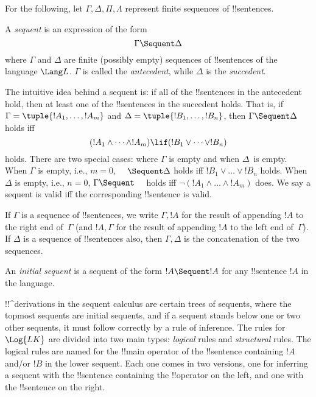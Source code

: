 \documentclass[../../../include/open-logic-section]{subfiles}
\begin{document}
      {}
      {}

For the following, let $\Gamma, \Delta, \Pi, \Lambda$ represent finite
sequences of !!{sentence}s.

\begin{defn}[Sequent]
A \emph{sequent} is an expression of the form
\[
\Gamma \Sequent \Delta
\]
where $\Gamma$ and $\Delta$ are finite (possibly empty) sequences of
!!{sentence}s of the language $\Lang L$. $\Gamma$ is called the
\emph{antecedent}, while $\Delta$ is the \emph{succedent}.
\end{defn}

\begin{explain}
The intuitive idea behind a sequent is: if all of the !!{sentence}s in
the antecedent hold, then at least one of the !!{sentence}s in the
succedent holds. That is, if $\Gamma = \tuple{!A_1, \dots, !A_m}$ and
$\Delta = \tuple{!B_1, \dots, !B_n}$, then $\Gamma \Sequent \Delta$
holds iff
\[
(!A_1 \land \cdots \land !A_m) \lif (!B_1 \lor \cdots \lor
!B_n)
\]
holds. There are two special cases: where $\Gamma$ is empty and when
$\Delta$~is empty. When $\Gamma$ is empty, i.e., $m = 0$, $\quad
\Sequent \Delta$ holds iff $!B_1 \lor \dots \lor !B_n$ holds. When
$\Delta$ is empty, i.e., $n = 0$, $\Gamma \Sequent \quad$ holds iff
$\lnot(!A_1 \land \dots \land !A_m)$ does.  We say a sequent is valid
iff the corresponding !!{sentence} is valid.
\end{explain}

If $\Gamma$ is a sequence of !!{sentence}s, we write $\Gamma, !A$ for
the result of appending $!A$ to the right end of~$\Gamma$ (and $!A,
\Gamma$ for the result of appending $!A$ to the left end
of~$\Gamma$). If $\Delta$ is a sequence of !!{sentence}s also, then $\Gamma,
\Delta$ is the concatenation of the two sequences.

\begin{defn}
An \emph{initial sequent} is a sequent
{of the form $!A \Sequent !A$} for any !!{sentence} $!A$ in the language.
\end{defn}

!!^{derivation}s in the sequent calculus are certain trees of
sequents, where the topmost sequents are initial sequents, and if a
sequent stands below one or two other sequents, it must follow
correctly by a rule of inference.  The rules for $\Log{LK}$ are
divided into two main types: \emph{logical} rules and
\emph{structural} rules.  The logical rules are named for the !!{main
  operator} of the !!{sentence} containing $!A$ and/or $!B$ in the
lower sequent. Each one comes in two versions, one for inferring a
sequent with the !!{sentence} containing the !!{operator} on the left,
and one with the !!{sentence} on the right.
\end{document}
